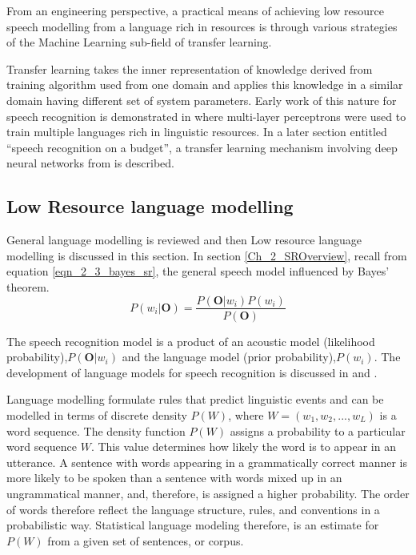 From an engineering perspective, a practical means of achieving low resource speech modelling from a language rich in resources is through various strategies of the Machine Learning sub-field of transfer learning.  

Transfer learning takes the inner representation of knowledge derived from training algorithm used from one domain and applies this knowledge in a similar domain having different set of system parameters\citep{ramachandran2016unsupervised}. Early work of this nature for speech recognition is demonstrated in \citep{vu2013multilingual} where multi-layer perceptrons were used to train multiple languages rich in linguistic resources. In a later section entitled “speech recognition on a budget”, a transfer learning mechanism involving deep neural networks from \citep{kunze2017transfer} is described.

\subsection{Low Resource language modelling} \label{sec_lrlm}

General language modelling is reviewed and then Low resource language modelling is discussed in this section.  In section \ref{Ch_2_SROverview}, recall from equation \ref{eqn_2_3_bayes_sr}, the general speech model influenced by Bayes' theorem.
\begin{equation}P(w_i|\mathbf{O})=\frac{P(\mathbf{O}|w_i)P(w_i)}{P(\mathbf{O})}
\label{eqn_2_5_bayes_sr}
\end{equation}

The speech recognition model is a product of an acoustic model (likelihood probability),$P(\mathbf{O}|w_i)$ and the language model (prior probability),$P(w_i)$.  The development of  language models for speech recognition is discussed in \cite{juang2000automatic} and \cite{1996YoungA}.  

Language modelling formulate rules that predict linguistic events and can be modelled in terms of discrete density $P(W)$, where  $W=(w_1, w_2,..., w_L)$ is a word sequence. The density function $P(W)$ assigns a probability to a particular word sequence $W$.  This value determines how likely the word is to appear in an utterance. A sentence with words appearing in a grammatically correct manner is more likely to be spoken than a sentence with words mixed up in an ungrammatical manner, and, therefore, is assigned a higher probability. The order of words therefore reflect the language structure, rules, and conventions in a probabilistic way. Statistical language modeling therefore, is an estimate for $P(W)$ from a given set of sentences, or corpus.

